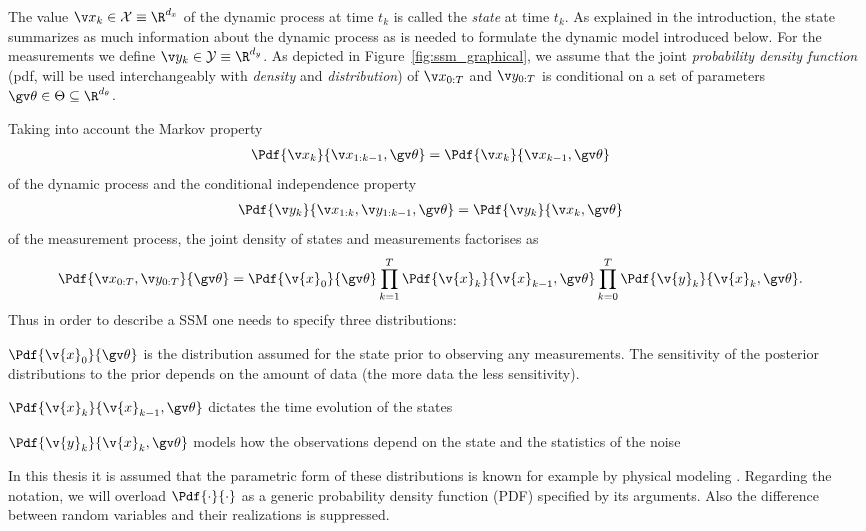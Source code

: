 The value $\xk \in \mathcal{X} \equiv \R^{d_x}$ of the dynamic process at time $t_k$ is called the
\emph{state} at time $t_k$. As explained in the introduction, the state summarizes as much information
about the dynamic process as is needed to formulate the dynamic model introduced below. 
For the measurements we define $\yk \in \mathcal{Y} \equiv \R^{d_y}$.
As depicted in Figure~\ref{fig:ssm_graphical}, we assume that the joint \emph{probability density function} 
(pdf, will be used interchangeably with \emph{density} and \emph{distribution}) of
$\X$ and $\Y$ is conditional on a set of parameters $\Th \in \Theta \subseteq \R^{d_\theta}$. 
 
Taking into account the Markov property
\begin{align}
	\Pdf{\xk}{\x_{1:k-1},\Th}&=\Pdf{\xk}{\x_{k-1},\Th}
\end{align}
of the dynamic process and the conditional
independence property 
\begin{align}
	\Pdf{\yk}{\x_{1:k},\y_{1:k-1},\Th}&=\Pdf{\yk}{\xk,\Th}
\end{align}
of the measurement process, the joint density of states
and measurements factorises as
\begin{align}
	\Pdf{\X,\Y}{\Th}&=\Pdf{\v{x}_0}{\Th}
	\prod_{k=1}^T\Pdf{\v{x}_k}{\v{x}_{k-1},\Th}
	\prod_{k=0}^T\Pdf{\v{y}_k}{\v{x}_{k},\Th}
	\label{eq:complete_data_likelihood}.
\end{align}
Thus in order to describe a SSM one needs to specify three distributions:
\begin{description}
\addtolength{\leftskip}{1cm}
	\item[Prior distribution]
	$\Pdf{\v{x}_0}{\Th}$ is the distribution assumed for the state prior to observing any measurements. The
	sensitivity of the posterior distributions to the prior depends on the amount of data (the more data the less sensitivity).
	\item[Dynamic model]
	$\Pdf{\v{x}_k}{\v{x}_{k-1},\Th}$ dictates the time evolution of the states
	\item[Measurement model]
	$\Pdf{\v{y}_k}{\v{x}_{k},\Th}$ models how the observations depend on the state and the statistics of the noise
\end{description}
In this thesis it is assumed that the parametric form of these distributions is known
for example by physical modeling \parencite{ljung1994modeling}. Regarding the notation,
we will overload $\Pdf{\cdot}{\cdot}$ as a generic probability density function (PDF) 
specified by its arguments. Also the difference between random variables and their realizations is suppressed.

